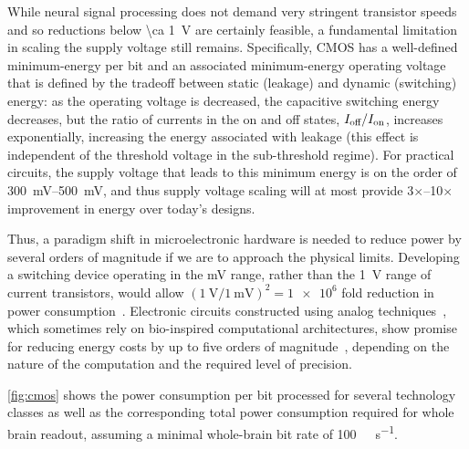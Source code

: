 While neural signal processing does not demand very stringent transistor speeds and so reductions below \SI{\ca 1}{\volt} are certainly feasible, a fundamental limitation in scaling the supply voltage still remains.
Specifically, CMOS has a well-defined minimum-energy per bit and an associated minimum-energy operating voltage that is defined by the tradeoff between static (leakage) and dynamic (switching) energy:
as the operating voltage is decreased, the capacitive switching energy decreases, but the ratio of currents in the on and off states, $I_{\text{\scriptsize off}}/I_{\text{\scriptsize on}}$, increases exponentially, increasing the energy associated with leakage (this effect is independent of the threshold voltage in the sub-threshold regime).
For practical circuits, the supply voltage that leads to this minimum energy is on the order of \SIrange{300}{500}{\milli\volt}, and thus supply voltage scaling will at most provide 3$\times$--10$\times$ improvement in energy over today's designs.

Thus, a paradigm shift in microelectronic hardware is needed to reduce power by several orders of magnitude if we are to approach the physical limits.
Developing a switching device operating in the \si{\milli\volt} range, rather than the \SI{1}{\volt} range of current transistors, would allow $\left(\SI{1}{\volt}/\SI{1}{\milli\volt}\right)^2=\num{1e6}$ fold reduction in power consumption~\cite{yablonovitch08}.
Electronic circuits constructed using analog techniques~\cite{sarpeshkar98}, which sometimes rely on bio-inspired computational architectures, show promise for reducing energy costs by up to five orders of magnitude~\cite{rapoport09,sarpeshkar98,mandal07}, depending on the nature of the computation and the required level of precision.

\autoref{fig:cmos} shows the power consumption per bit processed for several technology classes as well as the corresponding total power consumption required for whole brain readout, assuming a minimal whole-brain bit rate of \SI{100}{\giga\bit\per\second}.

